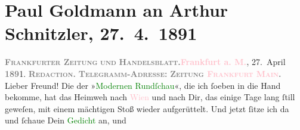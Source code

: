 

               \section[Paul Goldmann an Arthur Schnitzler, 27. 4. 1891]{ Paul Goldmann an Arthur Schnitzler, 27. 4. 1891}\nopagebreak{}\rehead{ }\normalsize\beginnumbering{} \toendnotes[C]{\smallbreak\pagebreak[2]} 
\toendnotes[C]{\smallbreak}\pstart
           \noindent{}{\pb}\textcolor{brown}{\textcolor{gray}{\textbf{\textsc{Frankfurter Zeitung}}}}{}\ledrightnote{\textcolor{brown}{Frankfurter Zeitung}}\pend
           \pstart
           \textcolor{gray}{\textbf{\textsc{und}}}\pend
           \pstart
           \textcolor{gray}{\textbf{\textsc{Handelsblatt.}}}\hfill \textcolor{gray}{\textbf{\textcolor{pink}{Frankfurt a. M.}{}\ledrightnote{\textcolor{pink}{Frankfurt am Main}}, }}27. April \textcolor{gray}{\textbf{189}}1.\pend
           \pstart
           \textcolor{gray}{\textbf{\textbf{\textsc{Redaction.}}}}\pend
           \pstart
           \textcolor{gray}{\textbf{\textbf{\textsc{Telegramm-Adresse:}}}}\pend
           \pstart
           \textcolor{gray}{\textbf{\textbf{\textsc{Zeitung \textcolor{pink}{Frankfurt
                              Main}{}\ledrightnote{\textcolor{pink}{Frankfurt am Main}}.}}}}\pend
           \pstart\center{}Lieber Freund!\pend\pstart
           Die \label{K_L02661-1v}\label{K_L02661-1h} der »\textcolor{green}{Modernen
                  Rundſchau}{}\ledrightnote{\textcolor{green}{Moderne Rundschau}}«, die ich ſoeben in die Hand bekomme, hat das Heimweh nach \textcolor{pink}{Wien}{}\ledrightnote{\textcolor{pink}{Wien}} und nach Dir, das einige Tage lang ſtill
               geweſen, mit einem mächtigen Stoß wieder aufgerüttelt. Und jetzt ſitze ich da und
               ſchaue Dein \textcolor{green}{Gedicht}{} an, und
